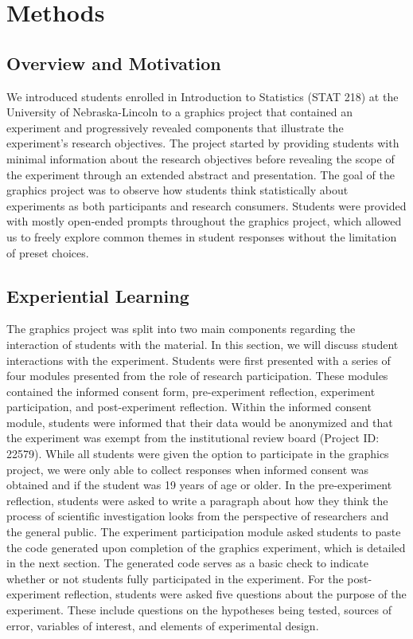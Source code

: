 \documentclass[
  12pt,
]{article}
\begin{document}
\section{Methods}\label{methods}

\subsection{Overview and Motivation}\label{overview-and-motivation}

We introduced students enrolled in Introduction to Statistics (STAT 218)
at the University of Nebraska-Lincoln to a graphics project that
contained an experiment and progressively revealed components that
illustrate the experiment's research objectives. The project started by
providing students with minimal information about the research
objectives before revealing the scope of the experiment through an
extended abstract and presentation. The goal of the graphics project was
to observe how students think statistically about experiments as both
participants and research consumers. Students were provided with mostly
open-ended prompts throughout the graphics project, which allowed us to
freely explore common themes in student responses without the limitation
of preset choices.

\subsection{Experiential Learning}\label{experiential-learning}

The graphics project was split into two main components regarding the
interaction of students with the material. In this section, we will
discuss student interactions with the experiment. Students were first
presented with a series of four modules presented from the role of
research participation. These modules contained the informed consent
form, pre-experiment reflection, experiment participation, and
post-experiment reflection. Within the informed consent module, students
were informed that their data would be anonymized and that the
experiment was exempt from the institutional review board (Project ID:
22579). While all students were given the option to participate in the
graphics project, we were only able to collect responses when informed
consent was obtained and if the student was 19 years of age or older. In
the pre-experiment reflection, students were asked to write a paragraph
about how they think the process of scientific investigation looks from
the perspective of researchers and the general public. The experiment
participation module asked students to paste the code generated upon
completion of the graphics experiment, which is detailed in the next
section. The generated code serves as a basic check to indicate whether
or not students fully participated in the experiment. For the
post-experiment reflection, students were asked five questions about the
purpose of the experiment. These include questions on the hypotheses
being tested, sources of error, variables of interest, and elements of
experimental design.
\end{document}
